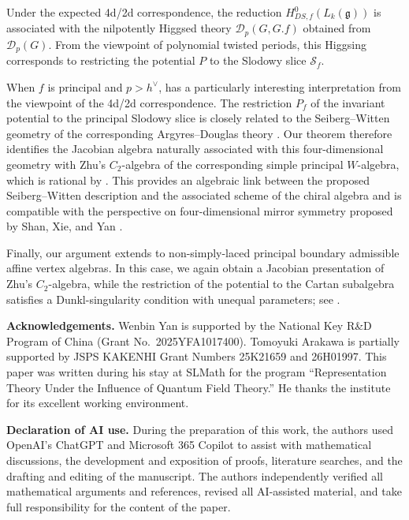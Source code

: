 \documentclass[11pt,reqno]{amsart}
\theoremstyle{remark}
\begin{document}
Under the expected 4d/2d correspondence, the reduction
$H_{DS,f}^0(L_k(\mathfrak g))$ is associated with the nilpotently
Higgsed theory $\mathcal D_p(G,G\mathord{.}f)$ obtained from
$\mathcal D_p(G)$. From the viewpoint of polynomial twisted periods,
this Higgsing corresponds to restricting the potential $P$ to the
Slodowy slice $\mathcal S_f$.

When $f$ is principal and $p>h^\vee$,  has a
particularly interesting interpretation from the viewpoint of the
4d/2d correspondence. The restriction $P_f$ of the invariant
potential to the principal Slodowy slice is closely related to the
Seiberg--Witten geometry of the corresponding Argyres--Douglas theory
\cite{KLS}. Our theorem therefore identifies the Jacobian algebra
naturally associated with this four-dimensional geometry with Zhu's
$C_2$-algebra of the corresponding simple principal $W$-algebra,
which is rational by \cite{Arational}. This provides an algebraic link
between the proposed Seiberg--Witten description and the associated
scheme of the chiral algebra and is compatible with the perspective
on four-dimensional mirror symmetry proposed by Shan, Xie, and Yan
\cite{SXY2}.

Finally, our argument extends to non-simply-laced principal boundary
admissible affine vertex algebras. In this case, we again obtain a Jacobian
presentation of Zhu's $C_2$-algebra, while the restriction of the potential to
the Cartan subalgebra satisfies a Dunkl-singularity condition with unequal
parameters; see .



\medskip
\noindent
\textbf{Acknowledgements.}
Wenbin Yan is supported by the National Key R\&D Program of China
(Grant No.~2025YFA1017400).
Tomoyuki Arakawa is partially supported by JSPS KAKENHI Grant Numbers
25K21659 and 26H01997.
This paper was written during his stay at SLMath for the program
``Representation Theory Under the Influence of Quantum Field Theory.''
He thanks the institute for its excellent working environment.

\medskip
\noindent
\textbf{Declaration of AI use.}
During the preparation of this work, the authors used OpenAI's ChatGPT
and Microsoft 365 Copilot to assist with mathematical discussions,
the development and exposition of proofs, literature searches, and
the drafting and editing of the manuscript. The authors independently
verified all mathematical arguments and references, revised all
AI-assisted material, and take full responsibility for the content of
the paper.
\end{document}
